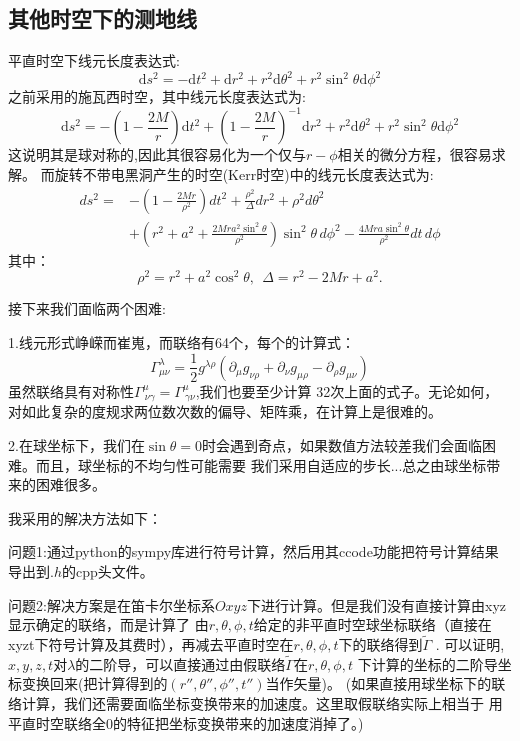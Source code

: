 \documentclass[a4paper, 12pt]{article}
\begin{document}
    \subsection{其他时空下的测地线}
    平直时空下线元长度表达式:
    \[\mathrm ds^2 = -\mathrm dt^2 +\mathrm dr^2 + r^2\mathrm d\theta^2 + r^2\sin^2 \theta \mathrm d\phi ^2\]
    之前采用的施瓦西时空，其中线元长度表达式为:
    \[\mathrm ds^2 = -(1-\frac{2M}{r} )\mathrm dt^2 +(1-\frac{2M}{r} )^{-1}\mathrm dr^2 + r^2\mathrm d\theta^2 + r^2\sin^2 \theta \mathrm d\phi ^2\]
    这说明其是球对称的,因此其很容易化为一个仅与$r-\phi$相关的微分方程，很容易求解。
    而旋转不带电黑洞产生的时空(Kerr时空)中的线元长度表达式为:
    \begin{align*}
    ds^2 =& -\left(1 - \frac{2Mr}{\rho^2}\right) dt^2 + \frac{\rho^2}{\Delta} dr^2 + \rho^2 d\theta^2\\
        & + \left(r^2 + a^2 + \frac{2Mr a^2 \sin^2 \theta}{\rho^2}\right) \sin^2 \theta \, d\phi^2 - \frac{4Mr a \sin^2 \theta}{\rho^2} dt \, d\phi
    \end{align*}
    其中：
    \[\rho^2 = r^2 + a^2 \cos^2 \theta, \ \ \Delta = r^2 - 2Mr + a^2. \]
    \par 接下来我们面临两个困难:
    \par 1.线元形式峥嵘而崔嵬，而联络有64个，每个的计算式：
    \[
    \Gamma^\lambda_{\mu\nu} = \frac{1}{2} g^{\lambda\rho} \left( \partial_\mu g_{\nu\rho} + \partial_\nu g_{\mu\rho} - \partial_\rho g_{\mu\nu} \right)
    \]
    虽然联络具有对称性$\Gamma^{\mu}_{\ \nu \gamma} = \Gamma^{\mu}_{\  \gamma\nu}$,我们也要至少计算
    32次上面的式子。无论如何，对如此复杂的度规求两位数次数的偏导、矩阵乘，在计算上是很难的。
    \par
    2.在球坐标下，我们在$\sin \theta = 0$时会遇到奇点，如果数值方法较差我们会面临困难。而且，球坐标的不均匀性可能需要
    我们采用自适应的步长...总之由球坐标带来的困难很多。
    \par
    我采用的解决方法如下：\par
    问题1:通过python的sympy库进行符号计算，然后用其ccode功能把符号计算结果导出到$.h$的cpp头文件。\par
    问题2:解决方案是在笛卡尔坐标系$Oxyz$下进行计算。但是我们没有直接计算由xyz显示确定的联络，而是计算了
    由$r,\theta,\phi,t$给定的非平直时空球坐标联络（直接在xyzt下符号计算及其费时），再减去平直时空在$r,\theta,\phi,t$下的联络得到$\widetilde{\Gamma}$ .
    可以证明,$x,y,z,t$对$\lambda$的二阶导，可以直接通过由假联络$\widetilde{\Gamma}$在$r,\theta,\phi,t$
    下计算的坐标的二阶导坐标变换回来(把计算得到的$(r'',\theta'',\phi'',t'')$当作矢量)。
    (如果直接用球坐标下的联络计算，我们还需要面临坐标变换带来的加速度。这里取假联络实际上相当于
    用平直时空联络全0的特征把坐标变换带来的加速度消掉了。)
\end{document}
